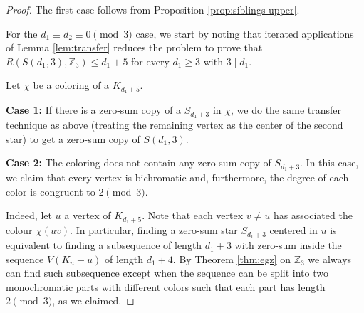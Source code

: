 \documentclass[11pt]{article}
\newcommand{\Z}{\mathbb Z}
\begin{document}
\begin{proof}
    The first case follows from Proposition \ref{prop:siblings-upper}.

    
    \medskip
    
    For the $d_1 \equiv d_2 \equiv 0 \pmod 3$ case, we start by noting that iterated applications of Lemma \ref{lem:transfer} reduces the problem to prove that $R(S(d_1,3),\mathbb{Z}_3)\leq d_1+5$ for every $d_1 \geq 3$ with $3 \mid d_1$.

    Let $\chi$ be a coloring of a $K_{d_1+5}$.

    \textbf{Case 1:} If there is a zero-sum copy of a $S_{d_1+3}$ in $\chi$, we do the same transfer technique as above (treating the remaining vertex as the center of the second star) to get a zero-sum copy of $S(d_1,3)$.

    \textbf{Case 2:} The coloring does not contain any zero-sum copy of $S_{d_1+3}$. In this case, we claim that every vertex is bichromatic and,     furthermore, the degree of each color is congruent to $2 \pmod{3}$. 

     Indeed, let $u$ a vertex of $K_{d_1+5}$. Note that each vertex $v\neq u$ has associated the colour $\chi(uv)$. In particular, finding a zero-sum star $S_{d_1+3}$ centered in $u$ is equivalent to finding a subsequence of length $d_1+3$ with zero-sum inside the sequence $V(K_n-u)$ of length $d_1+4$. By Theorem \ref{thm:egz} on $\Z_3$ we always can find such subsequence except when the sequence can be split into two monochromatic parts with different colors such that each part has length $2 \pmod{3}$, as we claimed.




\end{proof}
\end{document}
